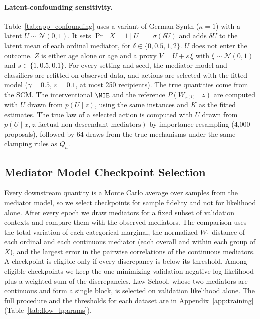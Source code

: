 \paragraph{Latent-confounding sensitivity.}
Table~\ref{tab:app_confounding} uses a variant of German-Synth ($\kappa=1$)
with a latent $U\sim\mathcal N(0,1)$. It sets $\Pr[X=1\mid U]=\sigma(\delta U)$
and adds $\delta U$ to the latent mean of each ordinal mediator, for
$\delta\in\{0,0.5,1,2\}$. $U$ does not enter the outcome. $Z$ is either age
alone or age and a proxy $V=U+s\,\xi$ with $\xi\sim\mathcal N(0,1)$ and
$s\in\{1,0.5,0.1\}$. For every setting and seed, the mediator model and
classifiers are refitted on observed data, and actions are selected with the
fitted model ($\gamma=0.5$, $\varepsilon=0.1$, at most 250 recipients). The
true quantities come from the SCM. The interventional $\NIE$ and the reference
$P(W_{x^{(1)}}\mid z)$ are computed with $U$ drawn from $p(U\mid z)$, using
the same instances and $K$ as the fitted estimates. The true law of a
selected action is computed with $U$ drawn from
$p(U\mid x,z,\text{factual non-descendant mediators})$ by importance
resampling (4{,}000 proposals), followed by 64 draws from the true mechanisms
under the same clamping rules as $Q_a$.

\subsection{Mediator Model Checkpoint Selection}
\label{app:exp_checkpoint}

Every downstream quantity is a Monte Carlo average over samples from the
mediator model, so we select checkpoints for sample fidelity and not for
likelihood alone. After every epoch we draw mediators for a fixed subset of
validation contexts and compare them with the observed mediators. The
comparison uses the total variation of each categorical marginal, the
normalized $W_1$ distance of each ordinal and each continuous mediator (each
overall and within each group of $X$), and the largest error in the pairwise
correlations of the continuous mediators. A checkpoint is eligible only if
every discrepancy is below its threshold. Among eligible checkpoints we keep
the one minimizing validation negative log-likelihood plus a weighted sum of
the discrepancies. Law School, whose two mediators are continuous and form a
single block, is selected on validation likelihood alone. The full procedure
and the thresholds for each dataset are in Appendix~\ref{app:training}
(Table~\ref{tab:flow_hparams}).

